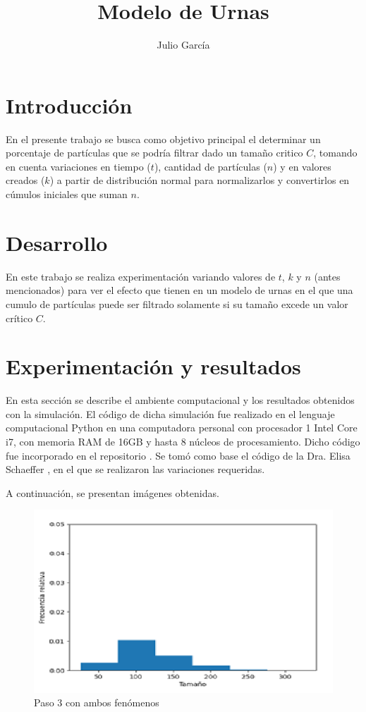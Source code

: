 \documentclass{article}
\title {Modelo de Urnas}
\author{Julio Garc\'ia}
\begin{document}
	\renewcommand{\listtablename}{Índice de tablas}
	\renewcommand{\tablename}{Cuadro}
	\maketitle
	
	\section{Introducción}
	En el presente trabajo se busca como objetivo principal el determinar un porcentaje de partículas que se podría filtrar dado un tamaño critico $C$, tomando en cuenta variaciones en tiempo ($t$), cantidad de partículas ($n$) y en valores creados ($k$) a partir de distribución normal para normalizarlos y convertirlos en cúmulos iniciales que suman $n$.  
                                                
	\section{Desarrollo}                                    
	En este trabajo se realiza experimentación variando valores de $t$, $k$ y $n$ (antes mencionados) para ver el efecto que tienen en un modelo de urnas en el que una cumulo de partículas puede ser filtrado solamente si su tamaño excede un valor crítico $C$.
	                                                        
	\section{Experimentación y resultados}                  
	En esta sección se describe el ambiente computacional y los resultados obtenidos con la simulación. El código de dicha simulación fue realizado en el lenguaje computacional Python en una computadora personal con procesador 1 Intel Core i7, con memoria RAM de 16GB y hasta 8 núcleos de procesamiento. Dicho código fue incorporado en el repositorio \cite{p_8}.  Se tomó como base el código de la Dra. Elisa Schaeffer \cite{p8}, en el que se realizaron las variaciones requeridas.
	
	A continuación, se presentan imágenes obtenidas.
	\newpage
	
		\begin{figure}[h!]
		\centering
		\includegraphics[width=0.7\linewidth]{Imagen_1.png}
		\caption{Paso 3 con ambos fenómenos}
		\label{fig:imagen1}
     	\end{figure}
     
\end{document}
